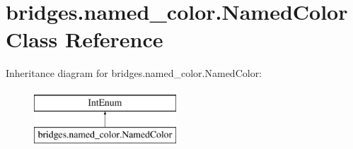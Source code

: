 \hypertarget{classbridges_1_1named__color_1_1_named_color}{}\section{bridges.\+named\+\_\+color.\+Named\+Color Class Reference}
\label{classbridges_1_1named__color_1_1_named_color}
Inheritance diagram for bridges.\+named\+\_\+color.\+Named\+Color\+:\begin{figure}[H]
\begin{center}
\leavevmode
\includegraphics[height=2.000000cm]{classbridges_1_1named__color_1_1_named_color}
\end{center}
\end{figure}
